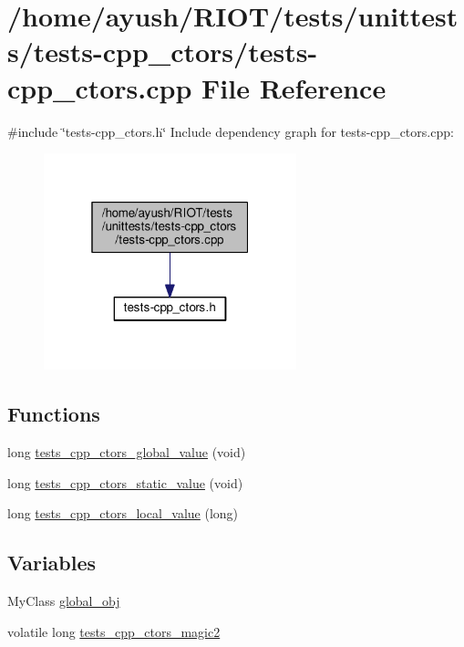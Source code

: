 \hypertarget{tests-cpp__ctors_8cpp}{}\section{/home/ayush/\+R\+I\+O\+T/tests/unittests/tests-\/cpp\+\_\+ctors/tests-\/cpp\+\_\+ctors.cpp File Reference}
\label{tests-cpp__ctors_8cpp}
{\ttfamily \#include \char`\"{}tests-\/cpp\+\_\+ctors.\+h\char`\"{}}\newline
Include dependency graph for tests-\/cpp\+\_\+ctors.cpp\+:
\nopagebreak
\begin{figure}[H]
\begin{center}
\leavevmode
\includegraphics[width=208pt]{tests-cpp__ctors_8cpp__incl}
\end{center}
\end{figure}
\subsection*{Functions}
\begin{DoxyCompactItemize}
\item 
long \hyperlink{tests-cpp__ctors_8cpp_abe68002aa60f5430c49e9a60c833204a}{tests\+\_\+cpp\+\_\+ctors\+\_\+global\+\_\+value} (void)
\item 
long \hyperlink{tests-cpp__ctors_8cpp_ab8822beb2f4902d29d43fcf2a5d4ba38}{tests\+\_\+cpp\+\_\+ctors\+\_\+static\+\_\+value} (void)
\item 
long \hyperlink{tests-cpp__ctors_8cpp_a178a532005cb4faa63ee21bcbe4f808a}{tests\+\_\+cpp\+\_\+ctors\+\_\+local\+\_\+value} (long)
\end{DoxyCompactItemize}
\subsection*{Variables}
\begin{DoxyCompactItemize}
\item 
My\+Class \hyperlink{tests-cpp__ctors_8cpp_a12eddc9a0315e3a3f8e1b0d7db244ac6}{global\+\_\+obj}
\item 
volatile long \hyperlink{tests-cpp__ctors_8cpp_a5d0a3a17669d50bc13f993a880e309f5}{tests\+\_\+cpp\+\_\+ctors\+\_\+magic2}
\end{DoxyCompactItemize}


